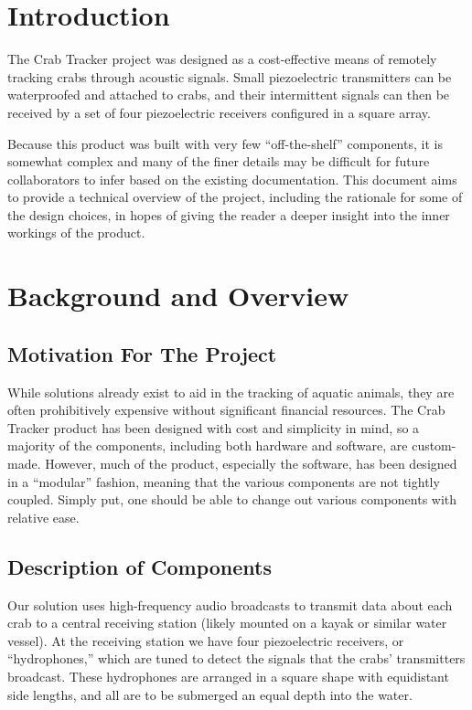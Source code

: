 \documentclass[12pt]{article}
\begin{document}
\section{Introduction}

The Crab Tracker project was designed as a cost-effective means of remotely
tracking crabs through acoustic signals.
Small piezoelectric transmitters can be waterproofed and attached to crabs,
and their intermittent signals can then be received by a set of four
piezoelectric receivers configured in a square array.

Because this product was built with very few ``off-the-shelf'' components,
it is somewhat complex and many of the finer details may be difficult for
future collaborators to infer based on the existing documentation.
This document aims to provide a technical overview of the project, including
the rationale for some of the design choices, in hopes of giving the reader
a deeper insight into the inner workings of the product.

\section{Background and Overview}

\subsection{Motivation For The Project}

While solutions already exist to aid in the tracking of aquatic animals,
they are often prohibitively expensive without significant financial resources.
The Crab Tracker product has been designed with cost and simplicity in mind,
so a majority of the components, including both hardware and software, are
custom-made.
However, much of the product, especially the software, has been designed
in a ``modular'' fashion, meaning that the various components are not tightly
coupled.
Simply put, one should be able to change out various components with relative
ease.

\subsection{Description of Components}

Our solution uses high-frequency audio broadcasts to transmit data about
each crab to a central receiving station (likely mounted on a kayak or similar
water vessel).
At the receiving station we have four piezoelectric receivers, or
``hydrophones,'' which are tuned to detect the signals that the crabs'
transmitters broadcast.
These hydrophones are arranged in a square shape with equidistant side
lengths, and all are to be submerged an equal depth into the water.
\end{document}
